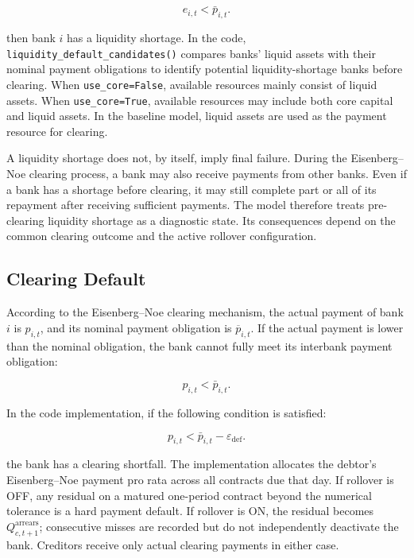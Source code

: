 \begin{equation}
e_{i,t}<\bar p_{i,t}.
\end{equation}


then bank \(i\) has a liquidity shortage. In the code,
\nolinkurl{liquidity_default_candidates()} compares banks' liquid assets with
their nominal payment obligations to identify potential
liquidity-shortage banks before clearing. When \texttt{use\_core=False},
available resources mainly consist of liquid assets. When
\texttt{use\_core=True}, available resources may include both core capital and
liquid assets. In the baseline model, liquid assets are used as the payment resource for clearing.

A liquidity shortage does not, by itself, imply final failure. During
the Eisenberg--Noe clearing process, a bank may also receive payments
from other banks. Even if a bank has a shortage before clearing, it may
still complete part or all of its repayment after receiving sufficient
payments. The model therefore treats pre-clearing liquidity shortage as
a diagnostic state. Its consequences depend on the common clearing
outcome and the active rollover configuration.

\subsection{Clearing Default}

According to the Eisenberg--Noe clearing mechanism, the actual payment
of bank \(i\) is \(p_{i,t}\), and its
nominal payment obligation is \({\overline{p}}_{i,t}\). If the actual
payment is lower than the nominal obligation, the bank cannot fully meet
its interbank payment obligation:


\begin{equation}
p_{i,t}<\bar p_{i,t}.
\end{equation}


In the code implementation, if the following condition is satisfied:


\begin{equation}
p_{i,t}<\bar p_{i,t}-\varepsilon_{\mathrm{def}}.
\end{equation}


the bank has a clearing shortfall. The implementation allocates the
debtor's Eisenberg--Noe payment pro rata across all contracts due that
day. If rollover is OFF, any residual on a matured one-period contract
beyond the numerical tolerance is a hard payment default. If rollover is
ON, the residual becomes \(Q_{c,t+1}^{\mathrm{arrears}}\); consecutive
misses are recorded but do not independently deactivate the bank.
Creditors receive only actual clearing payments in either case.

